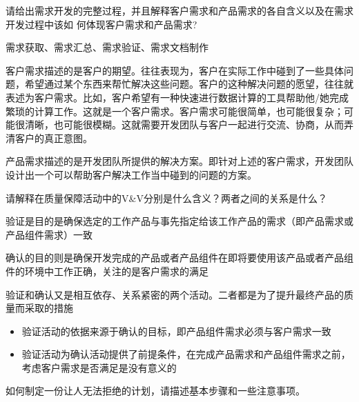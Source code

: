 \begin{problem}[2015]
请给出需求开发的完整过程，并且解释客户需求和产品需求的各自含义以及在需求开发过程中该如 何体现客户需求和产品需求?
\end{problem}

\begin{solution}
需求获取、需求汇总、需求验证、需求文档制作

客户需求描述的是客户的期望。往往表现为，客户在实际工作中碰到了一些具体问题，希望通过某个东西来帮忙解决这些问题。客户的这种解决问题的愿望，往往就表述为客户需求。比如，客户希望有一种快速进行数据计算的工具帮助他/她完成繁琐的计算工作。这就是一个客户需求。客户需求可能很简单，也可能很复杂；可能很清晰，也可能很模糊。这就需要开发团队与客户一起进行交流、协商，从而弄清客户的真正意图。

产品需求描述的是开发团队所提供的解决方案。即针对上述的客户需求，开发团队设计出一个可以帮助客户解决工作当中碰到的问题的方案。
\end{solution}



\begin{problem}[2015B]
请解释在质量保障活动中的V\&V分别是什么含义？两者之间的关系是什么？
\end{problem}

\begin{solution}
验证是目的是确保选定的工作产品与事先指定给该工作产品的需求（即产品需求或产品组件需求）一致

确认的目的则是确保开发完成的产品或者产品组件在即将要使用该产品或者产品组件的环境中工作正确，关注的是客户需求的满足

验证和确认又是相互依存、关系紧密的两个活动。二者都是为了提升最终产品的质量而采取的措施
\begin{itemize}
    \item 验证活动的依据来源于确认的目标，即产品组件需求必须与客户需求一致
    \item 验证活动为确认活动提供了前提条件，在完成产品需求和产品组件需求之前，考虑客户需求是否满足是没有意义的
\end{itemize}
\end{solution}



\begin{problem}[2013、2014、2015A、2015B、2016]
如何制定一份让人无法拒绝的计划，请描述基本步骤和一些注意事项。
\end{problem}

